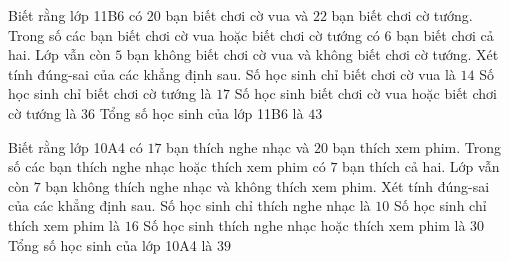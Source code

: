 \begin{ex}
 Biết rằng lớp 11B6 có ${20}$ bạn biết chơi cờ vua và ${22}$ bạn biết chơi cờ tướng. Trong số các bạn biết chơi cờ vua hoặc biết chơi cờ tướng có ${6}$ bạn biết chơi cả hai. Lớp vẫn còn ${5}$ bạn không biết chơi cờ vua và không biết chơi cờ tướng. Xét tính đúng-sai của các khẳng định sau.
\choiceTFt
{ \True Số học sinh chỉ biết chơi cờ vua là ${14}$ }
   { Số học sinh chỉ biết chơi cờ tướng là ${17}$  }
     { \True Số học sinh biết chơi cờ vua hoặc biết chơi cờ tướng là ${36}$ }
    { Tổng số học sinh của lớp 11B6 là ${43}$ }
\end{ex}

\begin{ex}
 Biết rằng lớp 10A4 có ${17}$ bạn thích nghe nhạc và ${20}$ bạn thích xem phim. Trong số các bạn thích nghe nhạc hoặc thích xem phim có ${7}$ bạn thích cả hai. Lớp vẫn còn ${7}$ bạn không thích nghe nhạc và không thích xem phim. Xét tính đúng-sai của các khẳng định sau.
\choiceTFt
{ \True Số học sinh chỉ thích nghe nhạc là ${10}$ }
   { Số học sinh chỉ thích xem phim là ${16}$  }
     { \True Số học sinh thích nghe nhạc hoặc thích xem phim là ${30}$ }
    { Tổng số học sinh của lớp 10A4 là ${39}$ }
\end{ex}


